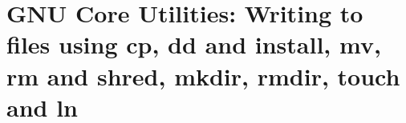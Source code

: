 
\chapter{GNU Core Utilities: Writing to files using cp, dd and install, mv, rm and shred, mkdir, rmdir, touch and ln}


